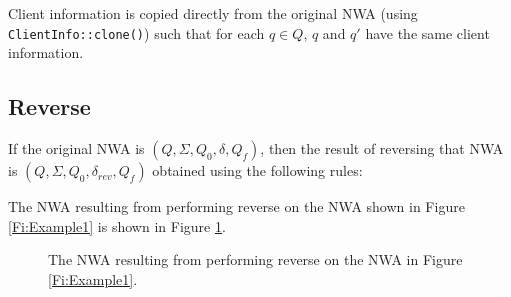 \goodbreak Client information is copied directly from the original NWA (using
\texttt{ClientInfo::clone()}) such that for each $q \in Q$, $q$
and $q'$ have the same client information.




\subsection{Reverse}
\label{Se:Reverse}

\begin{changebar}

If the original NWA is $(Q, \Sigma, Q_0, \delta, Q_f)$, then the result of
reversing that NWA is $(Q, \Sigma, Q_0, \delta_{rev}, Q_f)$ obtained using
the following rules:

\end{changebar}

\noindent The NWA resulting from performing reverse on the NWA shown in
Figure \ref{Fi:Example1} is shown in Figure \ref{Fi:Reverse1}.
 
\begin{figure}[p]
  \centering
  \caption{The NWA resulting from performing reverse on the NWA in Figure \ref{Fi:Example1}.}
  \label{Fi:Reverse1}
\end{figure}


